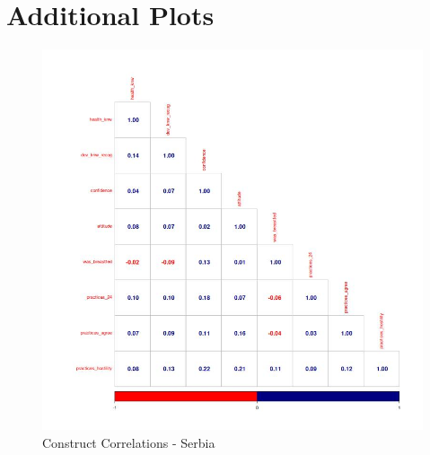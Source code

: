 \documentclass{article}
\begin{document}
% 



\section{Additional Plots}

\begin{figure}[H]
\begin{minipage}{.5\textwidth}
    \centering
    \includegraphics[scale=0.33]{descriptives/plots/correlations_constructs_Serbia_Baseline.jpg}
    \caption{Construct Correlations - Serbia}
    \label{fig:serbia correlations}
\end{minipage}%
\begin{minipage}{.5\textwidth}

\end{minipage}
\end{figure}
\end{document}
